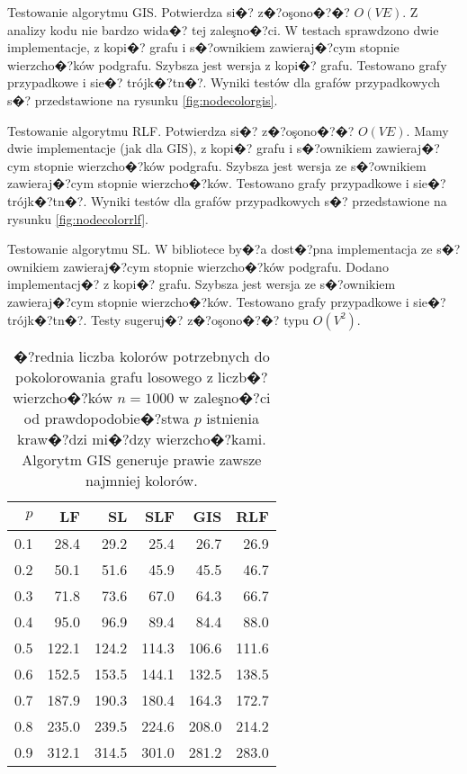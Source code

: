 \documentclass[12pt,a4paper]{mwrep}
\begin{document}
Testowanie algorytmu GIS.
Potwierdza si�? z�?oşono�?�? $O(V E)$.
Z analizy kodu nie bardzo wida�? tej zaleşno�?ci.
W testach sprawdzono dwie implementacje, z kopi�? grafu 
i s�?ownikiem zawieraj�?cym stopnie wierzcho�?ków podgrafu.
Szybsza jest wersja z kopi�? grafu.
Testowano grafy przypadkowe i sie�? trójk�?tn�?.
Wyniki testów dla grafów przypadkowych s�? przedstawione 
na rysunku \ref{fig:nodecolorgis}.

Testowanie algorytmu RLF.
Potwierdza si�? z�?oşono�?�? $O(V E)$.
Mamy dwie implementacje (jak dla GIS), z kopi�? grafu
i s�?ownikiem zawieraj�?cym stopnie wierzcho�?ków podgrafu.
Szybsza jest wersja ze s�?ownikiem zawieraj�?cym stopnie wierzcho�?ków.
Testowano grafy przypadkowe i sie�? trójk�?tn�?.
Wyniki testów dla grafów przypadkowych s�? przedstawione 
na rysunku \ref{fig:nodecolorrlf}.

Testowanie algorytmu SL.
W bibliotece by�?a dost�?pna implementacja ze s�?ownikiem zawieraj�?cym 
stopnie wierzcho�?ków podgrafu.
Dodano implementacj�? z kopi�? grafu.
Szybsza jest wersja ze s�?ownikiem zawieraj�?cym stopnie wierzcho�?ków.
Testowano grafy przypadkowe i sie�? trójk�?tn�?.
Testy sugeruj�? z�?oşono�?�? typu $O(V^2)$.

\begin{table}
\centering
\caption[Wyniki kolorowania grafów przypadkowych z $n=1000$.]{
�?rednia liczba kolorów potrzebnych do pokolorowania grafu 
losowego z liczb�? wierzcho�?ków $n=1000$ w zaleşno�?ci od
prawdopodobie�?stwa $p$ istnienia kraw�?dzi mi�?dzy wierzcho�?kami.
Algorytm GIS generuje prawie zawsze najmniej kolorów.
\label{tab:kolory1000}}
\begin{tabular}{|r|r|r|r|r|r|}
  \hline 
$p$ & \textbf{LF} & \textbf{SL}  & \textbf{SLF}  & \textbf{GIS} & \textbf{RLF} \\
  \hline 
0.1 &28.4  &29.2  &25.4  &26.7  &26.9  \\
  \hline 
0.2 &50.1  &51.6  &45.9  &45.5  &46.7  \\
  \hline 
0.3 &71.8  &73.6  &67.0  &64.3  &66.7  \\
  \hline 
0.4 &95.0  &96.9  &89.4  &84.4  &88.0  \\
  \hline 
0.5 &122.1  &124.2  &114.3  &106.6  &111.6  \\
  \hline 
0.6 &152.5  &153.5  &144.1  &132.5  &138.5  \\
  \hline 
0.7 &187.9  &190.3  &180.4  &164.3  &172.7  \\
  \hline 
0.8 &235.0  &239.5  &224.6  &208.0  &214.2  \\
  \hline
0.9 &312.1  &314.5  &301.0  &281.2  &283.0  \\
  \hline 
\end{tabular} 
\end{table}
\end{document}
